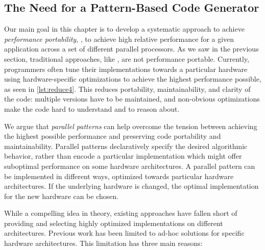 

\subsection{The Need for a Pattern-Based Code Generator}

Our main goal in this chapter is to develop a systematic approach to achieve \emph{performance portability}, \ie, to achieve high relative performance for a given application across a set of different parallel processors.
As we saw in the previous section, traditional approaches, like \OpenCL, are not performance portable.
Currently, programmers often tune their implementations towards a particular hardware using hardware-specific optimizations to achieve the highest performance possible, as seen in \autoref{lst:reduce4}.
This reduces portability, maintainability, and clarity of the code:
multiple versions have to be maintained, and non-obvious optimizations make the code hard to understand and to reason about.

We argue that \emph{parallel patterns} can help overcome the tension between achieving the highest possible performance and preserving code portability and maintainability.
Parallel patterns declaratively specify the desired algorithmic behavior, rather than encode a particular implementation which might offer suboptimal performance on some hardware architectures.
A parallel pattern can be implemented in different ways, optimized towards particular hardware architectures.
If the underlying hardware is changed, the optimal implementation for the new hardware can be chosen.

While a compelling idea in theory, existing approaches have fallen short of providing and selecting highly optimized implementations on different architectures.
Previous work has been limited to ad-hoc solutions for specific hardware architectures.
This limitation has three main reasons:

